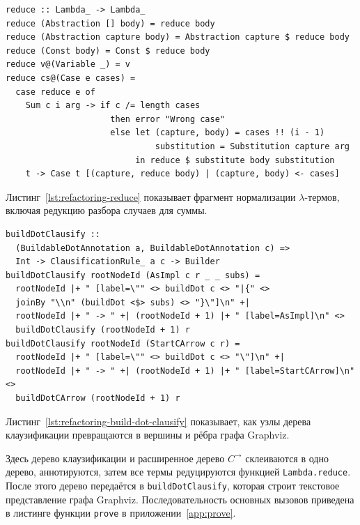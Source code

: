 \documentclass[14pt, russian]{scrartcl}
\begin{document}
\begin{listing}[!htb]
\caption{Фрагмент функции редукции \texttt{reduce}}
\label{lst:refactoring-reduce}
\begin{verbatim}
reduce :: Lambda_ -> Lambda_
reduce (Abstraction [] body) = reduce body
reduce (Abstraction capture body) = Abstraction capture $ reduce body
reduce (Const body) = Const $ reduce body
reduce v@(Variable _) = v
reduce cs@(Case e cases) =
  case reduce e of 
    Sum c i arg -> if c /= length cases
                     then error "Wrong case"
                     else let (capture, body) = cases !! (i - 1)
                              substitution = Substitution capture arg
                          in reduce $ substitute body substitution
    t -> Case t [(capture, reduce body) | (capture, body) <- cases]
\end{verbatim}
\end{listing}

Листинг~\ref{lst:refactoring-reduce} показывает фрагмент нормализации
$\lambda$-термов, включая редукцию разбора случаев для суммы.

\begin{listing}[!htb]
\caption{Фрагмент функции визуализации \texttt{buildDotClausify}}
\label{lst:refactoring-build-dot-clausify}
\begin{verbatim}
buildDotClausify ::
  (BuildableDotAnnotation a, BuildableDotAnnotation c) =>
  Int -> ClausificationRule_ a c -> Builder
buildDotClausify rootNodeId (AsImpl c r _ _ subs) = 
  rootNodeId |+ " [label=\"" <> buildDot c <> "|{" <>
  joinBy "\\n" (buildDot <$> subs) <> "}\"]\n" +|
  rootNodeId |+ " -> " +| (rootNodeId + 1) |+ " [label=AsImpl]\n" <>
  buildDotClausify (rootNodeId + 1) r
buildDotClausify rootNodeId (StartCArrow c r) = 
  rootNodeId |+ " [label=\"" <> buildDot c <> "\"]\n" +|
  rootNodeId |+ " -> " +| (rootNodeId + 1) |+ " [label=StartCArrow]\n" <>
  buildDotCArrow (rootNodeId + 1) r
\end{verbatim}
\end{listing}

Листинг~\ref{lst:refactoring-build-dot-clausify} показывает, как узлы дерева
клаузификации превращаются в вершины и рёбра графа Graphviz.

Здесь дерево клаузификации и расширенное дерево $C^{\rightarrow}$
склеиваются в одно дерево, аннотируются, затем все термы редуцируются функцией
\texttt{Lambda.reduce}. После этого дерево передаётся в \texttt{buildDotClausify},
которая строит текстовое представление графа Graphviz. Последовательность
основных вызовов приведена в листинге функции \texttt{prove} в
приложении~\ref{app:prove}.
\end{document}
